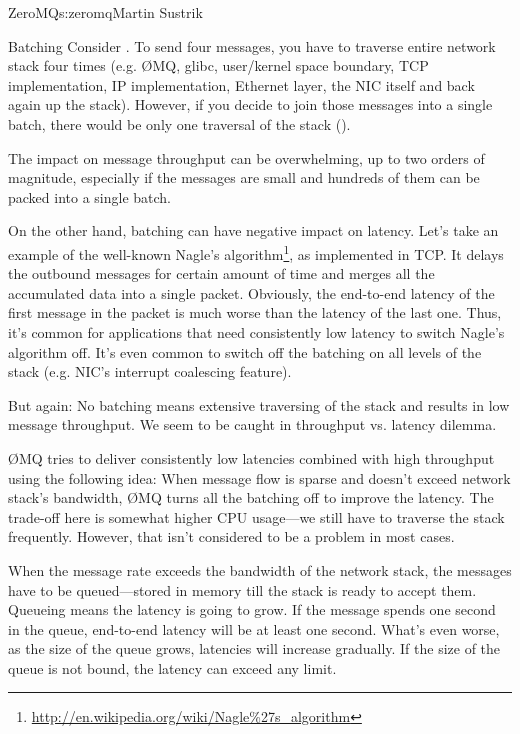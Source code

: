 \begin{aosachapter}{ZeroMQ}{s:zeromq}{Martin Sustrik}
\begin{aosasect1}{Batching}
Consider .  To send four messages, you
have to traverse entire network stack four times (e.g. ØMQ, glibc,
user/kernel space boundary, TCP implementation, IP implementation,
Ethernet layer, the NIC itself and back again up the stack). However,
if you decide to join those messages into a single batch, there would
be only one traversal of the stack
().


The impact on message throughput can be overwhelming, up to two orders
of magnitude, especially if the messages are small and hundreds of
them can be packed into a single batch.

On the other hand, batching can have negative impact on latency. Let's
take an example of the well-known Nagle's
algorithm\footnote{\url{http://en.wikipedia.org/wiki/Nagle\%27s_algorithm}},
as implemented in TCP. It delays the outbound messages for certain
amount of time and merges all the accumulated data into a single
packet. Obviously, the end-to-end latency of the first message in the
packet is much worse than the latency of the last one. Thus, it's
common for applications that need consistently low latency to switch
Nagle's algorithm off. It's even common to switch off the batching on
all levels of the stack (e.g. NIC's interrupt coalescing feature).

But again: No batching means extensive traversing of the stack and
results in low message throughput. We seem to be caught in throughput
vs. latency dilemma.

ØMQ tries to deliver consistently low latencies combined with high
throughput using the following idea: When message flow is sparse and
doesn't exceed network stack's bandwidth, ØMQ turns all the batching
off to improve the latency. The trade-off here is somewhat higher CPU
usage---we still have to traverse the stack frequently. However, that
isn't considered to be a problem in most cases.

When the message rate exceeds the bandwidth of the network stack, the
messages have to be queued---stored in memory till the stack is ready
to accept them. Queueing means the latency is going to grow. If the
message spends one second in the queue, end-to-end latency will be at
least one second. What's even worse, as the size of the queue grows,
latencies will increase gradually. If the size of the queue is not
bound, the latency can exceed any limit.


\end{aosasect1}
\end{aosachapter}
